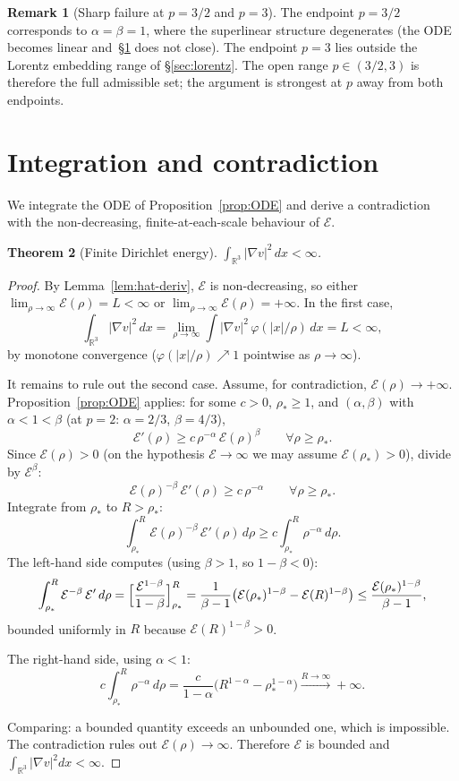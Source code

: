 \documentclass[11pt]{amsart}
\newtheorem{theorem}{Theorem}[section]
\theoremstyle{definition}
\newtheorem{remark}[theorem]{Remark}
\newcommand{\RR}{\mathbb{R}}
\newcommand{\EE}{\mathcal{E}}    %
\newcommand{\abs}[1]{|#1|}
\begin{document}
\begin{remark}[Sharp failure at $p = 3/2$ and $p = 3$]
The endpoint $p = 3/2$ corresponds to $\alpha = \beta = 1$, where
the superlinear structure degenerates (the ODE becomes linear
and~\S\ref{sec:contradiction} does not close). The endpoint
$p = 3$ lies outside the Lorentz embedding range of
\S\ref{sec:lorentz}. The open range $p \in (3/2, 3)$ is therefore
the full admissible set; the argument is strongest at $p$ away
from both endpoints.
\end{remark}

\section{Integration and contradiction}\label{sec:contradiction}

We integrate the ODE of Proposition~\ref{prop:ODE} and derive a
contradiction with the non-decreasing, finite-at-each-scale
behaviour of $\EE$.

\begin{theorem}[Finite Dirichlet energy]\label{thm:finite-D}
$\int_{\RR^3} \abs{\nabla v}^2\, dx < \infty$.
\end{theorem}

\begin{proof}
By Lemma~\ref{lem:hat-deriv}, $\EE$ is non-decreasing, so either
$\lim_{\rho \to \infty}\EE(\rho) = L < \infty$ or $\lim_{\rho \to
\infty}\EE(\rho) = +\infty$. In the first case,
\[
\int_{\RR^3}\abs{\nabla v}^2\,dx
= \lim_{\rho \to \infty} \int \abs{\nabla v}^2\,\varphi(\abs{x}/\rho)\,dx
= L < \infty,
\]
by monotone convergence ($\varphi(\abs{x}/\rho) \nearrow 1$
pointwise as $\rho \to \infty$).

It remains to rule out the second case. Assume, for contradiction,
$\EE(\rho) \to +\infty$. Proposition~\ref{prop:ODE} applies: for
some $c > 0$, $\rho_* \geq 1$, and $(\alpha, \beta)$ with
$\alpha < 1 < \beta$ (at $p = 2$: $\alpha = 2/3$, $\beta = 4/3$),
\[
\EE'(\rho) \geq c\,\rho^{-\alpha}\,\EE(\rho)^\beta
\qquad \forall \rho \geq \rho_*.
\]
Since $\EE(\rho) > 0$ (on the hypothesis $\EE \to \infty$ we may
assume $\EE(\rho_*) > 0$), divide by $\EE^\beta$:
\[
\EE(\rho)^{-\beta}\,\EE'(\rho) \geq c\,\rho^{-\alpha}
\qquad \forall \rho \geq \rho_*.
\]
Integrate from $\rho_*$ to $R > \rho_*$:
\[
\int_{\rho_*}^R \EE(\rho)^{-\beta}\,\EE'(\rho)\,d\rho
\geq c \int_{\rho_*}^R \rho^{-\alpha}\,d\rho.
\]
The left-hand side computes (using $\beta > 1$, so $1 - \beta < 0$):
\[
\int_{\rho_*}^R \EE^{-\beta}\,\EE'\,d\rho
= \Bigl[\frac{\EE^{1-\beta}}{1-\beta}\Bigr]_{\rho_*}^{R}
= \frac{1}{\beta - 1}\bigl(\EE(\rho_*)^{1 - \beta} - \EE(R)^{1-\beta}\bigr)
\leq \frac{\EE(\rho_*)^{1-\beta}}{\beta - 1},
\]
bounded uniformly in $R$ because $\EE(R)^{1-\beta} > 0$.

The right-hand side, using $\alpha < 1$:
\[
c\int_{\rho_*}^R \rho^{-\alpha}\,d\rho
= \frac{c}{1 - \alpha}\bigl(R^{1-\alpha} - \rho_*^{1-\alpha}\bigr)
\xrightarrow{R \to \infty} +\infty.
\]

Comparing: a bounded quantity exceeds an unbounded one, which is
impossible. The contradiction rules out
$\EE(\rho) \to \infty$. Therefore $\EE$ is bounded and
$\int_{\RR^3} \abs{\nabla v}^2 dx < \infty$.
\end{proof}
\end{document}
